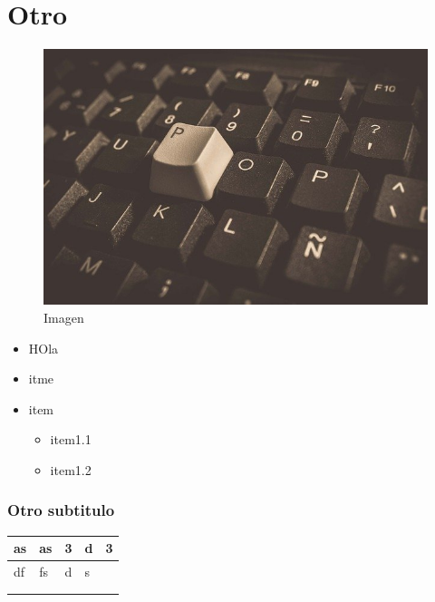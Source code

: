 \documentclass[]{article}
\providecommand{\tightlist}{%
  \setlength{\itemsep}{0pt}\setlength{\parskip}{0pt}}
\begin{document}
\hypertarget{otro}{%
\section{Otro}\label{otro}}

\begin{figure}
\centering
\includegraphics{../Images/keyboard-2223210_640.jpg}
\caption{Imagen}
\end{figure}

\begin{itemize}
\tightlist
\item
  HOla
\item
  itme
\item
  item

  \begin{itemize}
  \tightlist
  \item
    item1.1
  \item
    item1.2
  \end{itemize}
\end{itemize}

\hypertarget{otro-subtitulo}{%
\subsubsection{Otro subtitulo}\label{otro-subtitulo}}

\begin{table}[]
\begin{tabular}{|l|l|l|l|l|}
\hline
as & as & 3 & d & 3 \\ \hline
df & fs & d & s &   \\ \hline
   &    &   &   &   \\ \hline
   &    &   &   &   \\ \hline
\end{tabular}
\end{table}
\end{document}
